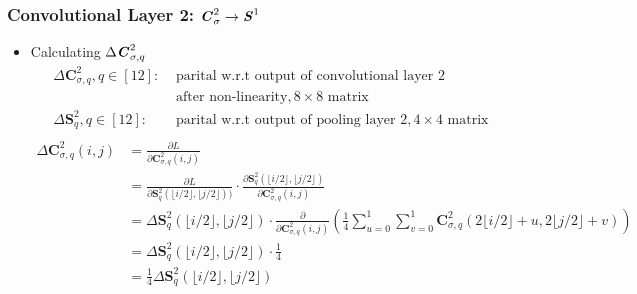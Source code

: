 \documentclass[12pt]{article}
\begin{document}
\subsubsection{Convolutional Layer 2: $\textbf{\textit{C}}^2_\sigma \rightarrow \textbf{\textit{S}}^1$}
\begin{itemize}
\item Calculating $\Delta \textbf{\textit{C}}_{\sigma, q}^2$
\begin{align*}
    \Delta \bm{C}_{\sigma, q}^2, q \in [12]:& \text{ parital w.r.t output of convolutional layer 2} \\& \text{ after non-linearity}, 8 \times 8 \text{ matrix}\\
    \Delta \bm{S}^2_q, q \in [12]:& \text{ parital w.r.t output of pooling layer 2}, 4 \times 4 \text{ matrix}\\
\end{align*}
\begin{align*}
    \Delta \bm{C}_{\sigma, q}^2(i, j)
    &= \frac{\partial L}{\partial \bm{C}_{\sigma, q}^2(i, j)}\\
    &= \frac{\partial L}{\partial \bm{S}_{q}^2(\lfloor{i / 2}\rfloor, \lfloor{j / 2}\rfloor))}
    \cdot
    \frac{\partial \bm{S}_{q}^2(\lfloor{i / 2}\rfloor, \lfloor{j / 2}\rfloor)}{\partial \bm{C}_{\sigma, q}^2(i, j)}\\
    &= \Delta \bm{S}_{q}^2(\lfloor{i / 2}\rfloor, \lfloor{j / 2}\rfloor) \cdot \frac{\partial}{\partial \bm{C}_{\sigma, q}^2(i, j)}\left(\frac{1}{4}\sum_{u = 0}^1\sum_{v = 0}^1\bm{C}^2_{\sigma, q}\left(2\lfloor{i / 2}\rfloor + u, 2\lfloor{j / 2}\rfloor + v\right)\right)\\
    &= \Delta \bm{S}_{q}^2(\lfloor{i / 2}\rfloor, \lfloor{j / 2}\rfloor) \cdot \frac{1}{4}\\
    &= \frac{1}{4}\Delta \bm{S}_{q}^2(\lfloor{i / 2}\rfloor, \lfloor{j / 2}\rfloor)
\end{align*}


\end{itemize}
\end{document}
